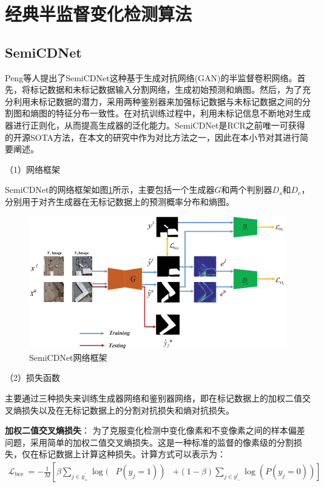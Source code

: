 \documentclass[lang=chs, degree=master, blindreview=false, adobe=false]{yanputhesis}
\begin{document}
\section{经典半监督变化检测算法}
\subsection{SemiCDNet}
Peng等人\cite{peng2021SemiCDNet}提出了SemiCDNet这种基于生成对抗网络(GAN)的半监督卷积网络。首先，将标记数据和未标记数据输入分割网络，生成初始预测和熵图。然后，为了充分利用未标记数据的潜力，采用两种鉴别器来加强标记数据与未标记数据之间的分割图和熵图的特征分布一致性。在对抗训练过程中，利用未标记信息不断地对生成器进行正则化，从而提高生成器的泛化能力。SemiCDNet是RCR之前唯一可获得的开源SOTA方法，在本文的研究中作为对比方法之一，因此在本小节对其进行简要阐述。

（1）网络框架

SemiCDNet的网络框架如图\ref{fig:SemiCDNetfram}所示，主要包括一个生成器$G$和两个判别器$D_s$和$D_e$，分别用于对齐生成器在无标记数据上的预测概率分布和熵图。
\begin{figure}[htb]
  \centering
  \includegraphics[scale=0.45]{images/SemiCDNetframe.png}
  \caption{
    SemiCDNet网络框架\cite{peng2021SemiCDNet}
  }
  \label{fig:SemiCDNetfram}
\end{figure}

（2）损失函数

主要通过三种损失来训练生成器网络和鉴别器网络，即在标记数据上的加权二值交叉熵损失以及在无标记数据上的分割对抗损失和熵对抗损失。

\textbf{加权二值交叉熵损失}：
为了克服变化检测中变化像素和不变像素之间的样本偏差问题，采用简单的加权二值交叉熵损失。这是一种标准的监督的像素级的分割损失，仅在标记数据上计算这种损失。计算方式可以表示为：
\begin{equation}
  \label{eq:SemiCDNetLossce}
  \begin{aligned}
    \mathcal{L}_{\text {bce }}=-\frac{1}{M}\left[\beta \sum_{j \in y_{+}^{\prime}} \log ( \right. & \left.P\left(y_{j}=1\right)\right)
    & \left.+(1-\beta) \sum_{j \in y_{-}^{l}} \log \left(P\left(y_{j}=0\right)\right)\right]
    \end{aligned}
\end{equation}
\end{document}
